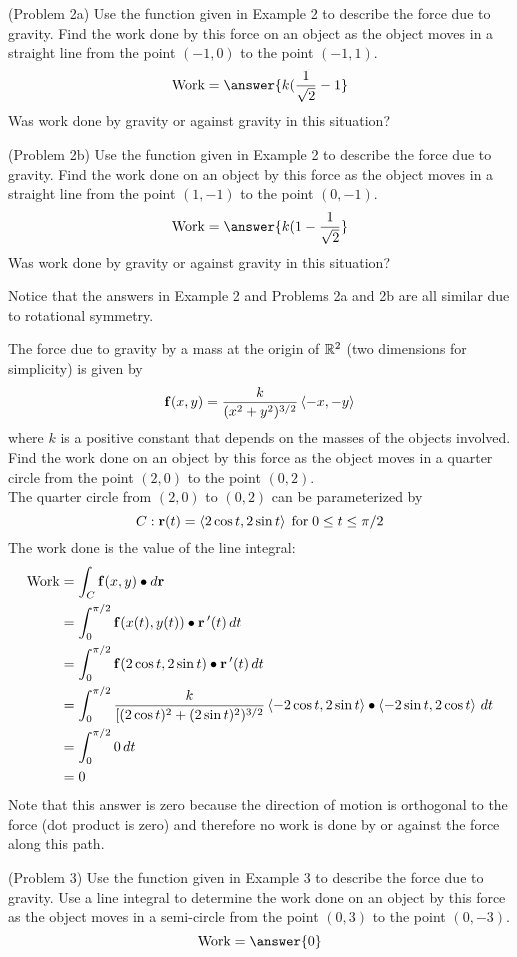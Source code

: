 \documentclass[handout]{ximera}
\begin{document}
\begin{problem}(Problem 2a)
Use the function given in Example 2 to describe the force due to gravity.
Find the work done by this force on an object as the object moves in a straight line from the point $(-1, 0)$ to the point $(-1,1)$.\\
\[
\text{Work} = \answer{k(\frac{1}{\sqrt 2} - 1}
\]
Was work done by gravity or against gravity in this situation? 
\end{problem}

\begin{problem}(Problem 2b)
Use the function given in Example 2 to describe the force due to gravity.
Find the work done on an object by this force as the object moves in a straight line from the point $(1, -1)$ to the point $(0, -1)$.\\
\[
\text{Work} = \answer{k(1-\frac{1}{\sqrt 2}}
\]
Was work done by gravity or against gravity in this situation? 
\end{problem}

Notice that the answers in Example 2 and Problems 2a and 2b are all similar due to rotational symmetry.

\begin{example}[Example 3]
The force due to gravity by a mass at the origin of $\mathbb R^2$ (two dimensions for simplicity) is given by
\[
\mathbf f(x,y) = \frac{k}{(x^2 + y^2)^{3/2}} \left\langle -x, -y\right\rangle
\]
where $k$ is a positive constant that depends on the masses of the objects involved. Find the work done on an object
by this force as the object moves in a quarter circle from the point $(2, 0)$ to the point $(0, 2)$.\\
The quarter circle from $(2, 0)$ to $(0, 2)$ can be parameterized by
\[
C: \mathbf r(t) = \left\langle 2\cos t, 2\sin t\right\rangle \; \text{for}   \; 0 \leq t \leq \pi/2
\]
The work done is the value of the line integral:
\begin{align*}
\text{Work} &= \int_C \mathbf f(x,y) \bullet d\mathbf r\\
            &= \int_0^{\pi/2} \mathbf f(x(t),y(t)) \bullet \mathbf r\,'(t) \, dt\\
            &= \int_0^{\pi/2} \mathbf f(2\cos t, 2\sin t) \bullet \mathbf r\,'(t) \, dt\\
            &= \int_0^{\pi/2} \frac{k}{[(2\cos t)^2 + (2\sin t)^2)^{3/2}} \left\langle -2\cos t, 2 \sin t\right\rangle \bullet \left\langle -2\sin t, 2 \cos t\right\rangle \, dt\\
            &= \int_0^{\pi/2} 0 \, dt\\
            &= 0
\end{align*}
Note that this answer is zero because the direction of motion is orthogonal to the force (dot product is zero) and 
therefore no work is done by or against the force along this path.
\end{example}

\begin{problem}(Problem 3)
Use the function given in Example 3 to describe the force due to gravity.
Use a line integral to determine the work done on an object
by this force as the object moves in a semi-circle from the point $(0, 3)$ to the point $(0, -3)$.\\
\[
\text{Work} = \answer{0}
\]

\end{problem}
\end{document}
